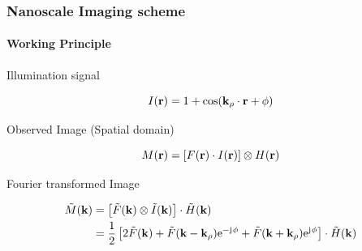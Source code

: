 \documentclass[mathserif,16pt,xcolor=table]{beamer}
\begin{document}
  \begin{frame}[t]
    \frametitle{Nanoscale Imaging scheme}
    \framesubtitle{Working Principle}
    \begin{outline}[itemize]
      \1 Illumination signal
    \end{outline}
    \begin{equation} \nonumber
      I(\mathbf{r}) = 1 + \cos(\mathbf{k}_{\rho} \cdot \mathbf{r} + \phi)
      \label{eq:intensity}
    \end{equation} \vspace*{-.5cm}
    \begin{outline}[itemize]
      \1 Observed Image (Spatial domain)
    \end{outline}
    \begin{equation} \nonumber
      M(\mathbf{r}) = \left[ F(\mathbf{r}) \cdot I(\mathbf{r}) \right] \otimes H(\mathbf{r})
      \label{eq:m_spatial_image}
    \end{equation} \vspace*{-.5cm}
    \begin{outline}[itemize]
      \1 Fourier transformed Image
    \end{outline}
    \begin{equation} \nonumber
      \begin{split}
        \tilde{M}(\mathbf{k}) &= \left[ \tilde{F}(\mathbf{k}) \otimes \tilde{I}(\mathbf{k}) \right] \cdot \tilde{H}(\mathbf{k}) \\
        &= \frac{1}{2} \left[ 2\tilde{F}(\mathbf{k}) + \tilde{F}(\mathbf{k} - \mathbf{k}_{\rho}) \mathrm{e}^{- \mathrm{j}\mkern1mu \phi} + \tilde{F}(\mathbf{k} + \mathbf{k}_{\rho}) \mathrm{e}^{\mathrm{j}\mkern1mu \phi} \right] \cdot \tilde{H}(\mathbf{k})
      \end{split}
      \label{eq:m_ft}
    \end{equation}
  \end{frame}
\end{document}

